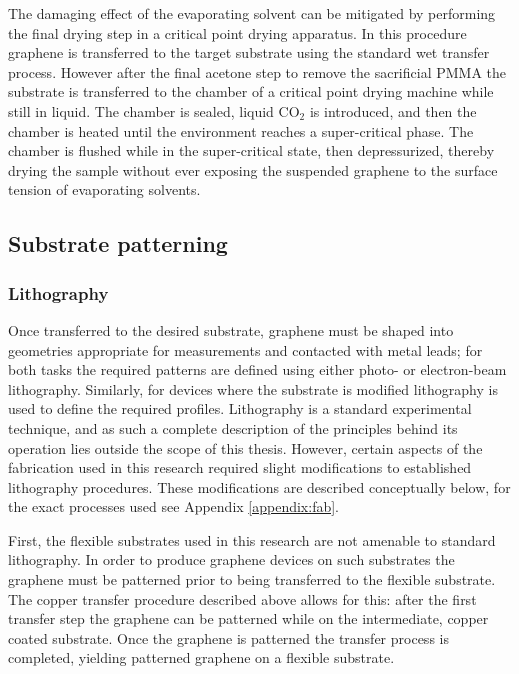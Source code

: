 \documentclass[edeposit,fullpage,draftthesis]{uiucthesis2009}
\begin{document}
        The damaging effect of the evaporating solvent can be mitigated by performing the final
        drying step in a critical point drying apparatus. In this procedure graphene
        is transferred to the target substrate using the standard wet transfer process. 
        However after the 
        final acetone step to remove the sacrificial PMMA the substrate is transferred
        to the chamber of a critical point drying machine while still in liquid.
        The chamber is sealed, liquid CO$_2$ is introduced, and then the chamber is heated until the environment 
        reaches a super-critical phase. The chamber is flushed while in the super-critical state,
        then depressurized, thereby drying the sample without ever exposing the suspended graphene 
        to the surface tension of evaporating solvents.
            
            
        \subsection{Substrate patterning}
        
            \subsubsection{Lithography}
            
            Once transferred to the desired substrate, graphene must be shaped into geometries
            appropriate for measurements and contacted with metal leads; for both tasks the 
            required patterns are defined using either photo- or electron-beam lithography.
            Similarly, for devices where the substrate is modified lithography is used to
            define the required profiles.
            Lithography is a standard experimental technique, and as such a complete description
            of the principles behind its operation lies outside the scope of this thesis. However,
            certain aspects of the fabrication used in this research required
            slight modifications to established lithography procedures. These modifications
            are described conceptually below, for the exact processes used see Appendix \ref{appendix:fab}.
            
            First, the flexible substrates used in this research are not amenable to standard lithography. 
            In order to produce graphene devices on such substrates the graphene must be patterned
            prior to being transferred to the flexible substrate. The copper transfer procedure
            described above allows for this: after the first transfer step the graphene 
            can be patterned while on the intermediate, copper coated substrate. Once the graphene
            is patterned the transfer process is completed, yielding patterned graphene on a flexible 
            substrate.
            
\end{document}
